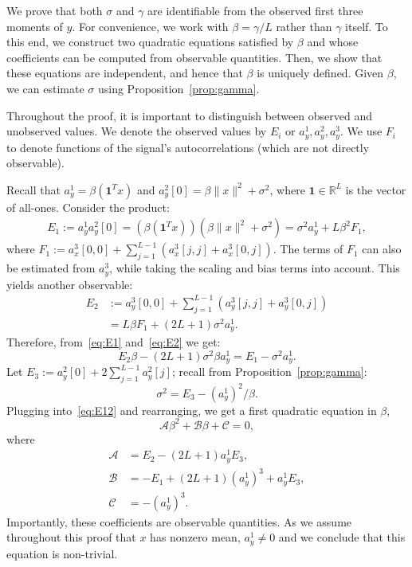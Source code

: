 \documentclass[12pt]{article}
\newcommand{\1}{\mathbf{1}}
\newcommand{\RL}{\mathbb{R}^L}
\newcommand{\one}{\mathbf{1}}
\theoremstyle{plain}
\theoremstyle{definition}
\theoremstyle{remark}
\theoremstyle{plain}
\theoremstyle{remark}
\theoremstyle{plain}
\theoremstyle{plain}
\theoremstyle{plain}
\numberwithin{equation}{section}
\begin{document}
We prove that both $\sigma$ and $\gamma$ are identifiable from the observed first three moments of $y$. For convenience, we work with $\beta = \gamma / L$ rather than $\gamma$ itself. To this end, we construct two quadratic equations satisfied by $\beta$ and whose coefficients can be computed from observable quantities. Then, we show that these equations are independent, and hence that $\beta$ is uniquely defined. Given $\beta$, we can estimate $\sigma$ using Proposition~\ref{prop:gamma}.

Throughout the proof, it is important to distinguish between observed and unobserved values.
We denote the observed values by $E_i$ or $a_y^1,a_y^2,a_y^3$. We use $F_i$ to denote functions of the signal's autocorrelations (which are not directly observable).

Recall that $a_y^1 = \beta(\one^Tx)$ and $a_y^2[0] = \beta\|x\|^2+\sigma^2$, where $\one\in\RL$ is the vector of all-ones.  Consider the product:
\begin{equation}\label{eq:E1}
\begin{split}
E_1 := a_y^1a_y^2[0] =  (\beta(\one^Tx))(\beta\|x\|^2+\sigma^2)  = \sigma^2a_y^1 + L\beta^2F_1,
\end{split}
\end{equation}
where $F_1 := a_x^3[0,0] + \sum_{j=1}^{L-1}(a_x^3[j,j] + a_x^3[0,j])$. 
The terms of $F_1$ can also be estimated from $a_y^3$, while taking the scaling and bias terms into account. This yields another observable:
\begin{align} 
E_2 & := a_y^3[0,0] + \sum_{j=1}^{L-1}(a_y^3[j,j] + a_y^3[0,j]) \nonumber\\
& = L\beta F_1 + (2L+1)\sigma^2a_y^1. \label{eq:E2}
\end{align}
Therefore, from~\eqref{eq:E1} and~\eqref{eq:E2} we get:
\begin{equation} \label{eq:E12}
E_2\beta -(2L+1)\sigma^2\beta a_y^1 = E_1-\sigma^2a_y^1.
\end{equation}
Let $E_3:=a_y^2[0] + 2\sum_{j = 1}^{L-1}a_y^2[j]$; recall from Proposition~\ref{prop:gamma}:
\begin{equation} \label{eq:sigma2}
\sigma^2 = E_3 - (a^1_y)^2/\beta. 
\end{equation} 
Plugging into~\eqref{eq:E12} and rearranging, we get a first quadratic equation in $\beta$,
\begin{equation} \label{eq:quad1}
\mathcal{A}\beta^2 + \mathcal{B}\beta + \mathcal{C} = 0,
\end{equation}
where 
\begin{align*}
\mathcal{A} &= E_2 - (2L+1)a_y^1E_3, \\ 
\mathcal{B} &= -E_1 + (2L+1)(a_y^1)^3 + a_y^1E_3  , \\
\mathcal{C} &= -(a_y^1)^3.
\end{align*}
Importantly, these coefficients are observable quantities. As we assume throughout this proof that $x$ has nonzero mean, $a_y^1 \neq 0$ and we conclude that this equation is non-trivial.
\end{document}
